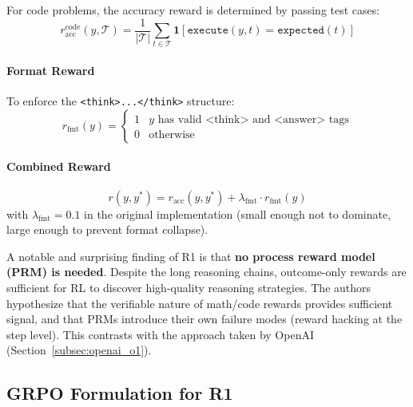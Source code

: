 For code problems, the accuracy reward is determined by passing test cases: 
\begin{equation}
    r_{\text{acc}}^{\text{code}}(y, \mathcal{T}) = \frac{1}{|\mathcal{T}|} \sum_{t \in \mathcal{T}} \mathbf{1}[\texttt{execute}(y, t) = \texttt{expected}(t)]
\end{equation}

\paragraph{Format Reward}
\label{format-reward}

To enforce the \texttt{<think>...</think>} structure: 
\begin{equation}
    r_{\text{fmt}}(y) = \begin{cases} 1 & y \text{ has valid <think> and <answer> tags} \\ 0 & \text{otherwise} \end{cases}
\end{equation}

\paragraph{Combined Reward}
\label{combined-reward}

\begin{equation}
    r(y, y^*) = r_{\text{acc}}(y, y^*) + \lambda_{\text{fmt}} \cdot r_{\text{fmt}}(y)
\end{equation}
 with $\lambda_{\text{fmt}} = 0.1$ in the original implementation (small enough not to dominate, large enough to prevent format collapse).

\begin{warningbox}
A notable and surprising finding of R1 is that \textbf{no process reward model (PRM) is needed}. Despite the long reasoning chains, outcome-only rewards are sufficient for RL to discover high-quality reasoning strategies. The authors hypothesize that the verifiable nature of math/code rewards provides sufficient signal, and that PRMs introduce their own failure modes (reward hacking at the step level). This contrasts with the approach taken by OpenAI (Section~\ref{subsec:openai_o1}).
\end{warningbox}

\subsection{GRPO Formulation for R1}
\label{subsubsec:grpo_r1_math}

